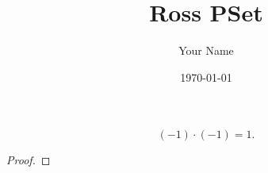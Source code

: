 \documentclass[11pt]{amsart}
\title{Ross PSet}
\date{\today}
\author{Your Name}
\begin{document}
\maketitle
\begin{Prob}{1}
\[
(-1)\cdot (-1) = 1. 
\]
\end{Prob}
\begin{proof}

\end{proof}
\end{document}
